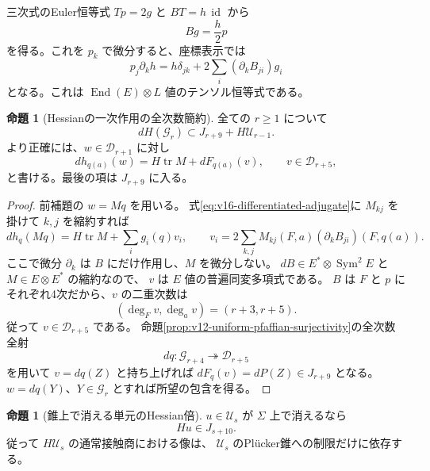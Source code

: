 \documentclass[a4paper,11pt]{ltjsarticle}
\theoremstyle{definition}
\newtheorem{proposition}[theorem]{命題}
\begin{document}
三次式のEuler恒等式 $Tp=2g$ と $BT=h\,\operatorname{id}$ から
\begin{equation}\label{eq:v16-adjugate-euler}
 B g=\frac h2p
\end{equation}
を得る。これを $p_k$ で微分すると、座標表示では
\begin{equation}\label{eq:v16-differentiated-adjugate}
 p_j\partial_k h
   =h\delta_{jk}+2\sum_i(\partial_k B_{ji})g_i
\end{equation}
となる。これは $\operatorname{End}(E)\otimes L$ 値のテンソル恒等式である。

\begin{proposition}[Hessianの一次作用の全次数簡約]
\label{prop:v16-hessian-derivation-reduction}
全ての $r\ge1$ について
\begin{equation}\label{eq:v16-all-hessian-action-mod-units}
 dH(\mathcal G_r)\subset J_{r+9}+H\mathcal U_{r-1}.
\end{equation}
より正確には、$w\in\mathcal D_{r+1}$ に対し
\[
 dh_{q(a)}(w)=H\operatorname{tr}M+dF_{q(a)}(v),\qquad
 v\in\mathcal D_{r+5},
\]
と書ける。最後の項は $J_{r+9}$ に入る。
\end{proposition}

\begin{proof}
前補題の $w=Mq$ を用いる。
式\eqref{eq:v16-differentiated-adjugate}に $M_{kj}$ を掛けて $k,j$ を縮約すれば
\[
 dh_q(Mq)=H\operatorname{tr}M+\sum_i g_i(q)v_i,
 \qquad
 v_i=2\sum_{k,j}M_{kj}(F,a)(\partial_kB_{ji})(F,q(a)).
\]
ここで微分 $\partial_k$ は $B$ にだけ作用し、$M$ を微分しない。
$dB\in E^*\otimes\operatorname{Sym}^2E$ と $M\in E\otimes E^*$ の縮約なので、
$v$ は $E$ 値の普遍同変多項式である。
$B$ は $F$ と $p$ にそれぞれ4次だから、$v$ の二重次数は
\[
 (\deg_Fv,\deg_av)=(r+3,r+5).
\]
従って $v\in\mathcal D_{r+5}$ である。
命題\ref{prop:v12-uniform-pfaffian-surjectivity}の全次数全射
\[
 dq:\mathcal G_{r+4}\twoheadrightarrow\mathcal D_{r+5}
\]
を用いて $v=dq(Z)$ と持ち上げれば $dF_q(v)=dP(Z)\in J_{r+9}$ となる。
$w=dq(Y)$、$Y\in\mathcal G_r$ とすれば所望の包含を得る。
\end{proof}

\begin{proposition}[錐上で消える単元のHessian倍]
\label{prop:v16-plucker-unit-annihilation}
$u\in\mathcal U_s$ が $\Sigma$ 上で消えるなら
\begin{equation}\label{eq:v16-ideal-unit-annihilation}
 Hu\in J_{s+10}.
\end{equation}
従って $H\mathcal U_s$ の通常接触商における像は、
$\mathcal U_s$ のPl\"ucker錐への制限だけに依存する。
\end{proposition}
\end{document}
